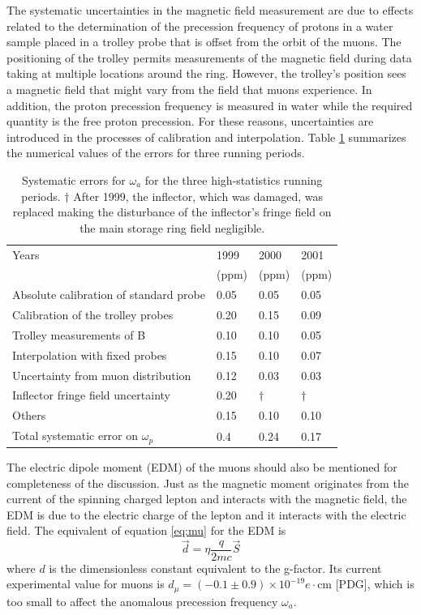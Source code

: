 \documentclass{outhesis}
\begin{document}
The systematic uncertainties in the magnetic field measurement are due to effects related to the determination of the precession frequency of protons in a water sample placed in a trolley probe that is offset from the orbit of the muons. The positioning of the trolley permits measurements of the magnetic field during data taking at multiple locations around the ring. However, the trolley's position sees a magnetic field that might vary from the field that muons experience. In addition, the proton precession frequency is measured in water while the required quantity is the free proton precession. For these reasons, uncertainties are introduced in the processes of calibration and interpolation. Table \ref{tab:wp} summarizes the numerical values of the errors for three running periods.
\begin{table}
  \caption{ Systematic errors for $\omega_a$ for the three high-statistics running periods. $\dagger$ After 1999, the inflector, which was damaged, was replaced making the disturbance of the inflector's fringe field on the main storage ring field negligible.}
  \label{tab:wp}
  \centering
  \begin{tabular}{*{4}{l}}
	\hline \hline
      Years   & 1999 & 2000  & 2001 \\ 
       & (ppm) & (ppm) & (ppm)\\
      \hline
       Absolute calibration of standard probe & 0.05 & 0.05 & 0.05  \\
       Calibration of the trolley probes & 0.20 & 0.15 & 0.09 \\
       Trolley measurements of B & 0.10 & 0.10 & 0.05  \\
       Interpolation with fixed probes & 0.15 & 0.10 &  0.07 \\
       Uncertainty from muon distribution & 0.12 & 0.03 & 0.03 \\
       Inflector fringe field uncertainty & 0.20 & $\dagger$ &  $\dagger$  \\
       Others  & 0.15 & 0.10 & 0.10     \\ \hline
       Total systematic error on $\omega_p$ & 0.4 & 0.24 & 0.17 \\ \hline  \hline
     \end{tabular}
\end{table}

The electric dipole moment (EDM) of the muons should also be mentioned for completeness of the discussion. Just as the magnetic moment originates from the current of the spinning charged lepton and interacts with the magnetic field, the EDM is due to the electric charge of the lepton and it interacts with the electric field. The equivalent of equation \ref{eq:mu} for the EDM is  
\begin{equation}
\overrightarrow{d} = \eta\frac{q}{2mc}\overrightarrow{S}
\label{eq:d}
\end{equation}
where $d$ is the dimensionless constant equivalent to the g-factor. Its current experimental value for muons is $d_\mu = \left(-0.1 \pm 0.9\right) \times 10^{-19} e \cdot \text{cm}$ [PDG], which is too small to affect the anomalous precession frequency $\omega_a$.
\end{document}
